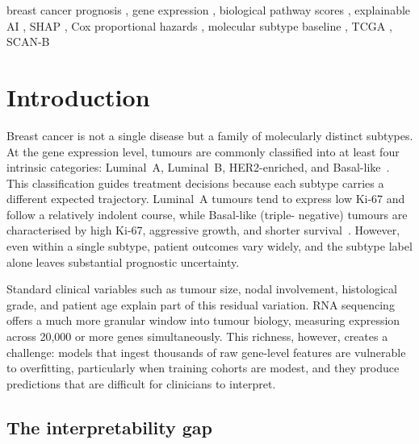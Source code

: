 \documentclass[review,12pt]{elsarticle}
\begin{document}
\begin{frontmatter}
\begin{abstract}
These results establish that pathway-oriented explainable ML delivers
transparent, generalisable breast cancer risk stratification with
prognostic value beyond molecular subtype classification, and that simple
mean z-score aggregation outperforms the standard ssGSEA approach for
compact curated gene sets.
\end{abstract}

\begin{keyword}
\sloppy
breast cancer prognosis \sep
gene expression \sep
biological pathway scores \sep
explainable AI \sep
SHAP \sep
Cox proportional hazards \sep
molecular subtype baseline \sep
TCGA \sep
SCAN-B
\end{keyword}

\end{frontmatter}

\section{Introduction}
\label{sec:intro}

Breast cancer is not a single disease but a family of molecularly
distinct subtypes.  At the gene expression level, tumours are commonly
classified into at least four intrinsic categories: Luminal~A,
Luminal~B, HER2-enriched, and Basal-like~\citep{tcga2012}.  This
classification guides treatment decisions because each subtype carries a
different expected trajectory.  Luminal~A tumours tend to express low
Ki-67 and follow a relatively indolent course, while Basal-like (triple-
negative) tumours are characterised by high Ki-67, aggressive growth, and
shorter survival~\citep{dowsett2011}.  However, even within a single
subtype, patient outcomes vary widely, and the subtype label alone leaves
substantial prognostic uncertainty.

Standard clinical variables such as tumour size, nodal involvement,
histological grade, and patient age explain part of this residual
variation.  RNA sequencing offers a much more granular window into
tumour biology, measuring expression across 20,000 or more genes
simultaneously.  This richness, however, creates a challenge: models
that ingest thousands of raw gene-level features are vulnerable to
overfitting, particularly when training cohorts are modest, and they
produce predictions that are difficult for clinicians to interpret.

\subsection{The interpretability gap}
\label{sec:gap}
\end{document}
